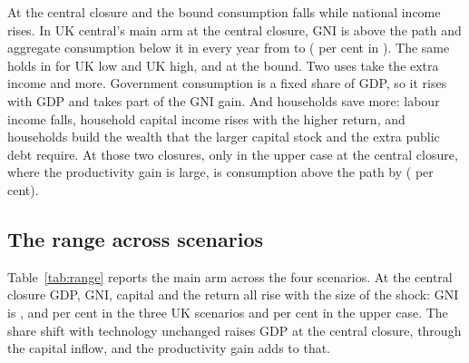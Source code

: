 At the central closure and the bound consumption falls while national income rises. In UK central's main arm at the central closure, GNI is above the path and aggregate consumption below it in every year from \genShockYear{} to \genLastFlowYear{} (\genUkCentralMainConsumptionCentral{} per cent in \genHeadYear{}). The same holds in \genHeadYear{} for UK low and UK high, and at the bound. Two uses take the extra income and more. Government consumption is a fixed share of GDP, so it rises with GDP and takes part of the GNI gain. And households save more: labour income falls, household capital income rises with the higher return, and households build the wealth that the larger capital stock and the extra public debt require. At those two closures, only in the upper case at the central closure, where the productivity gain is large, is consumption above the path by \genHeadYear{} (\genKorinekMainConsumptionCentral{} per cent).

\subsection{The range across scenarios}
\label{sec:results-range}

Table~\ref{tab:range} reports the main arm across the four scenarios. At the central closure GDP, GNI, capital and the return all rise with the size of the shock: GNI is \genUkLowMainGniCentral{}, \genUkCentralMainGniCentral{} and \genUkHighMainGniCentral{} per cent in the three UK scenarios and \genKorinekMainGniCentral{} per cent in the upper case. The share shift with technology unchanged raises GDP at the central closure, through the capital inflow, and the productivity gain adds to that.

